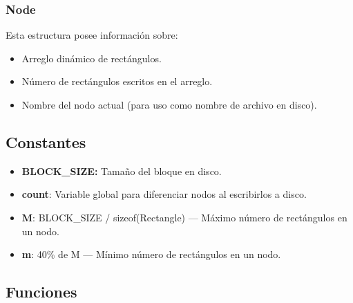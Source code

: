 \documentclass[letterpaper,10pt]{article}
\begin{document}
	\subsubsection{Node}

	Esta estructura posee información sobre:
	\begin{itemize}
		\item Arreglo dinámico de rectángulos.
		\item Número de rectángulos escritos en el arreglo.
		\item Nombre del nodo actual (para uso como nombre de archivo en disco).
	\end{itemize}

	\subsection{Constantes}

	\begin{itemize}
		\item \textbf{BLOCK\_SIZE:} Tamaño del bloque en disco.
		\item \textbf{count}: Variable global para diferenciar nodos al escribirlos a disco.
		\item \textbf{M}: BLOCK\_SIZE / sizeof(Rectangle) --- Máximo número de rectángulos en un nodo.
		\item \textbf{m}: 40\% de M --- Mínimo número de rectángulos en un nodo.
	\end{itemize}

	\subsection{Funciones}
\end{document}
